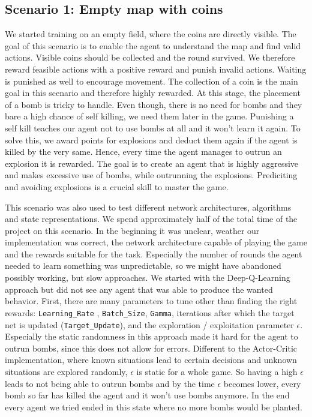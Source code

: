 \documentclass[]{scrartcl}
\begin{document}
\subsection*{Scenario 1: Empty map with coins}
We started training on an empty field, where the coins are directly visible. The goal of this scenario is to enable the agent to understand the map and find valid actions. Visible coins should be collected and the round survived. We therefore reward feasible actions with a positive reward and punish invalid actions. Waiting is punished as well to encourage movement. The collection of a coin is the main goal in this scenario and therefore highly rewarded. At this stage, the placement of a bomb is tricky to handle. Even though, there is no need for bombs and they bare a high chance of self killing, we need them later in the game. Punishing a self kill teaches our agent not to use bombs at all and it won't learn it again. To solve this, we award points for explosions and deduct them again if the agent is killed by the very same. Hence, every time the agent manages to outrun an explosion it is rewarded. The goal is to create an agent that is highly aggressive and makes excessive use of bombs, while outrunning the explosions. Prediciting and avoiding explosions is a crucial skill to master the game.

This scenario was also used to test different network architectures, algorithms and state representations. We spend approximately half of the total time of the project on this scenario. In the beginning it was unclear, weather our implementation was correct, the network architecture capable of playing the game and the rewards suitable for the task. Especially the number of rounds the agent needed to learn something was unpredictable, so we might have abandoned possibly working, but slow approaches. 
We started with the Deep-Q-Learning approach but did not see any agent that was able to produce the wanted behavior. First, there are many parameters to tune other than finding the right rewards: \texttt{Learning\_Rate} , \texttt{Batch\_Size}, \texttt{Gamma},  iterations after which the target net is updated (\texttt{Target\_Update}), and the exploration / exploitation parameter $\epsilon$. Especially the static randomness in this approach made it hard for the agent to outrun bombs, since this does not allow for errors. Different to the Actor-Critic implementation, where known situations lead to certain decisions and unknown situations are explored randomly, $\epsilon$ is static for a whole game. So having a high $\epsilon$ leads to not being able to outrun bombs and by the time $\epsilon$ becomes lower, every bomb so far has killed the agent and it won't use bombs anymore. In the end every agent we tried ended in this state where no more bombs would be planted.
\end{document}
